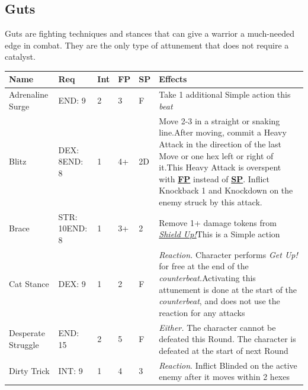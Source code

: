 \documentclass[12pt]{article}
\newcommand{\refto}[1]{\hyperlink{#1}{\textbf{#1}}}
\newcommand{\reftoit}[1]{\hyperlink{#1}{\emph{#1}}}
\begin{document}
\subsection{Guts}
Guts are fighting techniques and stances that can give a warrior a much-needed edge in combat. They are the only type of attunement that does not require a catalyst.
\begin{center}
\begin{tabularx}{\textwidth}{p{}p{}p{}p{}p{}p{}}
\hline
\rowcolor{white} \textbf{Name} & \textbf{Req} & \textbf{Int} & \textbf{FP} & \textbf{SP} & \textbf{Effects}\setcounter{rownum}{0}\\
\hline
Adrenaline Surge & END: 9 & 2 & 3 & F & Take 1 additional Simple action this \emph{beat}\\
Blitz & DEX: 8\newline END: 8 & 1 & 4+ & 2D & Move 2-3 in a straight or snaking line.\newline After moving, commit a Heavy Attack in the direction of the last Move or one hex left or right of it.\newline This Heavy Attack is overspent with \refto{FP} instead of \refto{SP}. Inflict Knockback 1 and Knockdown on the enemy struck by this attack.\\
Brace & STR: 10\newline END: 8 & 1 & 3+ & 2 & Remove 1+ damage tokens from \reftoit{Shield Up!}\newline This is a Simple action\\
Cat Stance & DEX: 9 & 1 & 2 & F & \emph{Reaction.} Character performs \emph{Get Up!} for free at the end of the \emph{counterbeat.}\newline Activating this attunement is done at the start of the \emph{counterbeat}, and does not use the reaction for any attacks\\
Desperate Struggle & END: 15 & 2 & 5 & F & \emph{Either.} The character cannot be defeated this Round. The character is defeated at the start of next Round \\
Dirty Trick & INT: 9 & 1 & 4 & 3 & \emph{Reaction}. Inflict Blinded on the active enemy after it moves within 2 hexes\\
\hline
\end{tabularx}
\end{center}

\pagebreak
\end{document}
